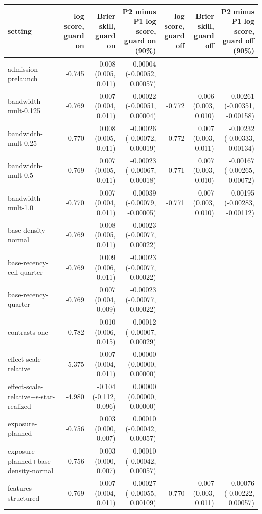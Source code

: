 \begin{tabular}{lrrrrrr}
\toprule
setting & log score, guard on & Brier skill, guard on & P2 minus P1 log score, guard on (90\%) & log score, guard off & Brier skill, guard off & P2 minus P1 log score, guard off (90\%) \\
\midrule
admission-prelaunch & -0.745 & 0.008 (0.005, 0.011) & 0.00004 (-0.00052, 0.00057) &  &  &  \\
bandwidth-mult-0.125 & -0.769 & 0.007 (0.004, 0.011) & -0.00022 (-0.00051, 0.00004) & -0.772 & 0.006 (0.003, 0.010) & -0.00261 (-0.00351, -0.00158) \\
bandwidth-mult-0.25 & -0.770 & 0.008 (0.005, 0.011) & -0.00026 (-0.00072, 0.00019) & -0.772 & 0.007 (0.003, 0.011) & -0.00232 (-0.00333, -0.00134) \\
bandwidth-mult-0.5 & -0.769 & 0.007 (0.005, 0.011) & -0.00023 (-0.00067, 0.00018) & -0.771 & 0.007 (0.003, 0.010) & -0.00167 (-0.00265, -0.00072) \\
bandwidth-mult-1.0 & -0.770 & 0.007 (0.004, 0.011) & -0.00039 (-0.00079, -0.00005) & -0.771 & 0.007 (0.003, 0.010) & -0.00195 (-0.00283, -0.00112) \\
base-density-normal & -0.769 & 0.008 (0.005, 0.011) & -0.00023 (-0.00077, 0.00022) &  &  &  \\
base-recency-cell-quarter & -0.769 & 0.009 (0.006, 0.011) & -0.00023 (-0.00077, 0.00022) &  &  &  \\
base-recency-quarter & -0.769 & 0.007 (0.004, 0.009) & -0.00023 (-0.00077, 0.00022) &  &  &  \\
contrasts-one & -0.782 & 0.010 (0.006, 0.015) & 0.00012 (-0.00007, 0.00029) &  &  &  \\
effect-scale-relative & -5.375 & 0.007 (0.004, 0.011) & 0.00000 (0.00000, 0.00000) &  &  &  \\
effect-scale-relative+s-star-realized & -4.980 & -0.104 (-0.112, -0.096) & 0.00000 (0.00000, 0.00000) &  &  &  \\
exposure-planned & -0.756 & 0.003 (0.000, 0.007) & 0.00010 (-0.00042, 0.00057) &  &  &  \\
exposure-planned+base-density-normal & -0.756 & 0.003 (0.000, 0.007) & 0.00010 (-0.00042, 0.00057) &  &  &  \\
features-structured & -0.769 & 0.007 (0.004, 0.011) & 0.00027 (-0.00055, 0.00109) & -0.770 & 0.007 (0.003, 0.011) & -0.00076 (-0.00222, 0.00057) \\

\end{tabular}
